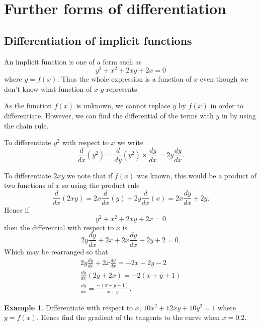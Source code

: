 \documentclass[
  11pt,
  oneside]{book}
\newcommand{\slide}{}
\theoremstyle{definition}
\theoremstyle{definition}
\newtheorem{example}{Example}[chapter]
\theoremstyle{definition}
\theoremstyle{definition}
\theoremstyle{remark}
\begin{document}
\slide

\section{Further forms of differentiation}\label{further-forms-of-differentiation}

\subsection{Differentiation of implicit functions}\label{differentiation-of-implicit-functions}

An implicit function is one of a form such as
\[
y^2 + x^2 + 2xy + 2x = 0
\]
where \(y = f(x)\). Thus the whole expression is a function of \(x\) even though we don't know what function of \(x\) \(y\) represents.

As the function \(f(x)\) is unknown, we cannot replace \(y\) by \(f(x)\) in order to differentiate. However, we can find the differential of the terms with \(y\) in by using the chain rule.

To differentiate \(y^2\) with respect to \(x\) we write
\[
\frac{d}{dx}(y^2) = \frac{d}{dy}(y^2)\times\frac{dy}{dx}= 2y\frac{dy}{dx}.
\]
\slide
To differentiate \(2xy\) we note that if \(f(x)\) was known, this would be a product of two functions of \(x\) so using the product rule
\[
\frac{d}{dx}(2xy) = 2x\frac{d}{dx}(y)+2y\frac{d}{dx}(x) = 2x\frac{dy}{dx} + 2y.
\]
Hence if
\[
y^2 + x^2 + 2xy + 2x = 0
\]
then the differential with respect to \(x\) is
\[
2y\frac{dy}{dx} + 2x+2x\frac{dy}{dx} +2y+2 = 0.
\]
Which may be rearranged so that
\begin{gather*}
2y\frac{dy}{dx}+2x\frac{dy}{dx} = -2x-2y-2\\
\frac{dy}{dx}(2y+2x) = -2(x+y+1)\\
\frac{dy}{dx} = \frac{-(x+y+1)}{x+y}.
\end{gather*}
\slide

\begin{example}
Differentiate with respect to \(x\), \(10x^2 + 12xy + 10y^2 = 1\) where \(y = f(x)\). Hence find the gradient of the tangents to the curve when \(x=0.2\).
\end{example}
\end{document}
